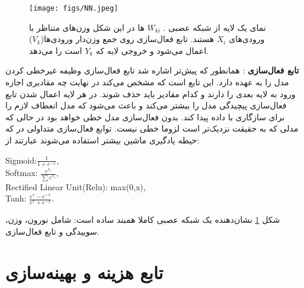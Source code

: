  \begin{figure}
	\begin{center}
		\texttt{[image: figs/NN.jpeg]}
	\end{center}
	\caption[.  $w_{ki}$
	ها در این شکل وزن‌های متناظر با ورودی‌های 
	$x_i$
	هستند . تابع فال‌سازی روی جمع وزن‌دار ورودی‌ها($V_k$) اعمال می‌شود و خروجی لایه که $y_k$ است را می‌دهد.نمای یک لایه از شبکه عصبی]{
		نمای یک لایه از شبکه عصبی
		\cite{bansal2009matlab}. 
		 $W_{ki}$
		ها در این شکل وزن‌های متناظر با ورودی‌های 
		$X_i$
		هستند. تابع فعال‌سازی روی جمع وزن‌دار ورودی‌ها($V_k$) اعمال می‌شود و خروجی لایه که $Y_k$ است را می‌دهد. 
	}
	
	\label{fig:NN}
\end{figure} 
\textbf{تابع فعال‌سازی}
: همانطور که پیش‌تر اشاره شد تابع فعال‌سازی وظیفه غیرخطی کردن مدل را به عهده دارد. این تابع است که مشخص می‌کند در نهایت چه مقادیری اجازه ورود به لایه بعدی را دارند و کدام مقادیر باید حذف شوند. در هر لایه اعمال شدن تابع فعال‌سازی پیچیدگی مدل را بیشتر می‌کند و باعث می‌شود که مدل انعطاف لازم را برای سازگاری با داده پیدا کند. بدون فعال‌سازی مدل خطی خواهد بود در حالی که مدلی که به حقیقت نزدیک‌تر است لزوما خطی نیست.
توابع فعال‌سازی متداولی در که حیطه یادگیری ماشین بیشتر استفاده می‌شوند عبارتند از:
\begin{latin}
	
Sigmoid:$\frac{1}{1+e^{-x}}$,\\ 
Softmax: $\frac{e^{x_i}}{\sum{e^{x_i}}}$,\\
Rectified Linear Unit(Relu): max(0,x), \\
Tanh: $\frac{e^{x}-e^{-x}}{e^{x}+e^{-x}}$.

\end{latin}

\cite{nwankpa2018activation}   
شکل 
\ref{fig:NN}
نشان‌دهنده یک شبکه عصبی کاملا همبند ساده است: شامل نورون، وزن، سوییدگی و تابع فعال‌سازی.  
  \section{تابع هزینه و بهینه‌سازی}
